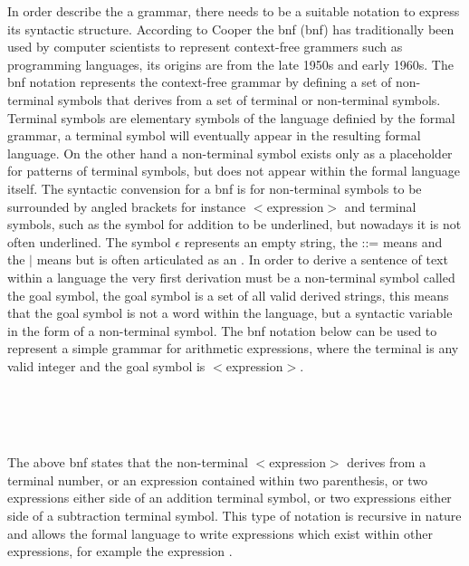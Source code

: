 In order describe the a grammar, there needs to be a suitable notation to express its syntactic structure. According to Cooper the \acrlong{bnf} (\acrshort{bnf}) has traditionally been used by computer scientists to represent context-free grammers such as programming languages, its origins are from the late 1950s and early 1960s. The \acrshort{bnf} notation represents the context-free grammar by defining a set of non-terminal symbols that derives from a set of terminal or non-terminal symbols. Terminal symbols are elementary symbols of the language definied by the formal grammar, a terminal symbol will eventually appear in the resulting formal language. On the other hand a non-terminal symbol exists only as a placeholder for patterns of terminal symbols, but does not appear within the formal language itself. The syntactic convension for a \acrshort{bnf} is for non-terminal symbols to be surrounded by angled brackets for instance $<$expression$>$ and terminal symbols, such as the symbol for addition \say{+} to be underlined, but nowadays it is not often underlined. The symbol $\epsilon$ represents an empty string, the ::= means  and the $\mid$ means  but is often articulated as an  \cite{cooper2011engineering}. In order to derive a sentence of text within a language the very first derivation must be a non-terminal symbol called the goal symbol, the goal symbol is a set of all valid derived strings, this means that the goal symbol is not a word within the language, but a syntactic variable in the form of a non-terminal symbol. The \acrshort{bnf} notation below can be used to represent a simple grammar for arithmetic expressions, where the terminal  is any valid integer and the goal symbol is $<$expression$>$.

\onehalfspacing
\begin{bnf*}
		{}\\
		\\
		\\
\end{bnf*}

The above \acrshort{bnf} states that the non-terminal $<$expression$>$ derives from a terminal number, or an expression contained within two parenthesis, or two expressions either side of an addition terminal symbol, or two expressions either side of a subtraction terminal symbol. This type of notation is recursive in nature and allows the formal language to write expressions which exist within other expressions, for example the expression . 

